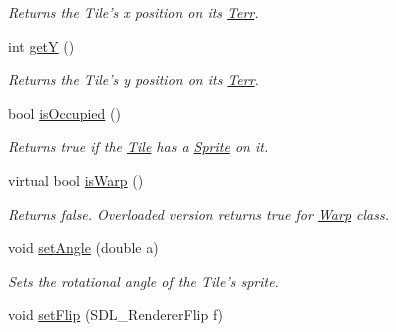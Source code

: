 \begin{DoxyCompactItemize}
\begin{DoxyCompactList}\small\item\em Returns the Tile’s x position on its \hyperlink{class_terr}{Terr}. \end{DoxyCompactList}\item 
int \hyperlink{class_tile_acf97bff4aac74cc8d7e09bc8ca5afa68}{getY} ()\hypertarget{class_tile_acf97bff4aac74cc8d7e09bc8ca5afa68}{}\label{class_tile_acf97bff4aac74cc8d7e09bc8ca5afa68}

\begin{DoxyCompactList}\small\item\em Returns the Tile’s y position on its \hyperlink{class_terr}{Terr}. \end{DoxyCompactList}\item 
bool \hyperlink{class_tile_ac556e7bbe293dde62d66b46e3d12bcb7}{is\+Occupied} ()\hypertarget{class_tile_ac556e7bbe293dde62d66b46e3d12bcb7}{}\label{class_tile_ac556e7bbe293dde62d66b46e3d12bcb7}

\begin{DoxyCompactList}\small\item\em Returns true if the \hyperlink{class_tile}{Tile} has a \hyperlink{class_sprite}{Sprite} on it. \end{DoxyCompactList}\item 
virtual bool \hyperlink{class_tile_a5ef077b74542da250b812bc708920e8a}{is\+Warp} ()\hypertarget{class_tile_a5ef077b74542da250b812bc708920e8a}{}\label{class_tile_a5ef077b74542da250b812bc708920e8a}

\begin{DoxyCompactList}\small\item\em Returns false. Overloaded version returns true for \hyperlink{class_warp}{Warp} class. \end{DoxyCompactList}\item 
void \hyperlink{class_tile_a94f9e2d35e55c1d1b9f56dbd7816f51a}{set\+Angle} (double a)\hypertarget{class_tile_a94f9e2d35e55c1d1b9f56dbd7816f51a}{}\label{class_tile_a94f9e2d35e55c1d1b9f56dbd7816f51a}

\begin{DoxyCompactList}\small\item\em Sets the rotational angle of the Tile’s sprite. \end{DoxyCompactList}\item 
void \hyperlink{class_tile_a801a349b0e7f7500b60af91e5e821f2e}{set\+Flip} (S\+D\+L\+\_\+\+Renderer\+Flip f)\hypertarget{class_tile_a801a349b0e7f7500b60af91e5e821f2e}{}\label{class_tile_a801a349b0e7f7500b60af91e5e821f2e}


\end{DoxyCompactItemize}
